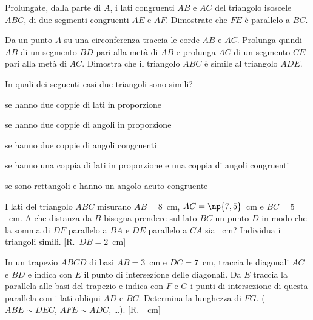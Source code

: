 \begin{multicols}{2}
\begin{esercizio}
\label{ese:6.77}
Prolungate, dalla parte di $A$, i lati congruenti $AB$ e $AC$ del triangolo isoscele $ABC$, di due segmenti congruenti $AE$ e $AF$. Dimostrate che $FE$ è parallelo a $BC$.
\end{esercizio}

\begin{esercizio}
\label{ese:6.78}
Da un punto $A$ su una circonferenza traccia le corde $AB$ e $AC$. Prolunga quindi $AB$ di un segmento $BD$ pari alla metà di $AB$ e prolunga $AC$ di un segmento $CE$ pari alla metà di $AC$. Dimostra che il triangolo $ABC$ è simile al triangolo $ADE$.
\end{esercizio}

\begin{esercizio}
\label{ese:6.79}
In quali dei seguenti casi due triangoli sono simili?
\begin{enumeratea}
\item se hanno due coppie di lati in proporzione\tab\hfill\boxV\quad\boxF
\item se hanno due coppie di angoli in proporzione\tab\hfill\boxV\quad\boxF
\item se hanno due coppie di angoli congruenti\tab\hfill\boxV\quad\boxF
\item se hanno una coppia di lati in proporzione e una coppia di angoli congruenti\tab\hfill\boxV\quad\boxF
\item se sono rettangoli e hanno un angolo acuto congruente\hfill\boxV\quad\boxF
\end{enumeratea}
\end{esercizio}

\begin{esercizio}
\label{ese:6.80}
I lati del triangolo $ABC$ misurano $AB=8$~cm, $AC=\np{7,5}$~cm e $BC=5$~cm. A che distanza da $B$ bisogna prendere sul lato $BC$ un punto $D$ in modo che la somma di $DF$ parallelo a $BA$ e $DE$ parallelo a $CA$ sia ~cm? Individua i triangoli simili.	[R.~$DB=2$~cm]
\end{esercizio}

\begin{esercizio}
\label{ese:6.81}
In un trapezio $ABCD$ di basi $AB=3$~cm e $DC=7$~cm, traccia le diagonali $AC$ e $BD$ e indica con $E$ il punto di intersezione delle diagonali. Da $E$ traccia la parallela alle basi del trapezio e indica con $F$ e $G$ i punti di intersezione di questa parallela con i lati obliqui $AD$ e $BC$. Determina la lunghezza di $FG$. ($ABE\sim DEC$, $AFE\sim ADC$, \ldots). [R.~~cm]
\end{esercizio}


\end{multicols}

